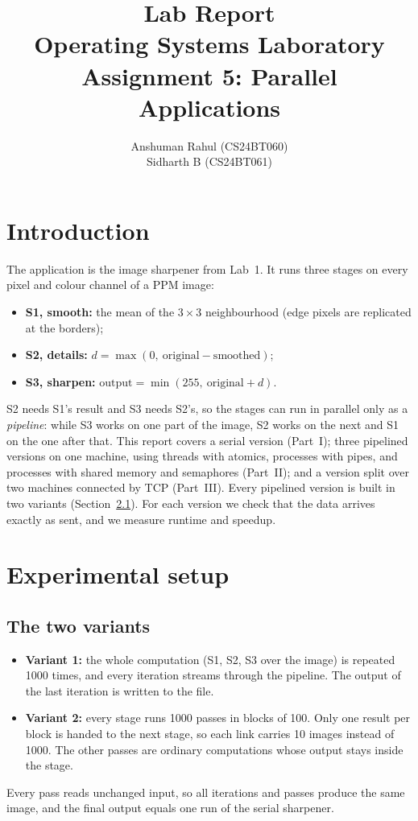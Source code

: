 \documentclass[11pt,a4paper]{article}
\title{\textbf{Lab Report} \\ Operating Systems Laboratory \\ Assignment 5: Parallel Applications}
\author{Anshuman Rahul (CS24BT060) \\ Sidharth B (CS24BT061)}
\date{}
\newcommand{\cfgIterations}{1000}
\newcommand{\cfgPasses}{100}
\newcommand{\cfgResults}{10}
\begin{document}
\maketitle

\section{Introduction}
The application is the image sharpener from Lab~1. It runs three stages on every pixel and
colour channel of a PPM image:
\begin{itemize}
\item \textbf{S1, smooth:} the mean of the $3\times3$ neighbourhood (edge pixels are replicated at
  the borders);
\item \textbf{S2, details:} $d = \max(0,\ \text{original} - \text{smoothed})$;
\item \textbf{S3, sharpen:} $\text{output} = \min(255,\ \text{original} + d)$.
\end{itemize}
S2 needs S1's result and S3 needs S2's, so the stages can run in parallel only as a
\emph{pipeline}: while S3 works on one part of the image, S2 works on the next and S1 on the one
after that. This report covers a serial version (Part~I); three pipelined versions on one
machine, using threads with atomics, processes with pipes, and processes with shared memory and
semaphores (Part~II); and a version split over two machines connected by TCP (Part~III). Every
pipelined version is built in two variants (Section~\ref{sec:variants}). For each version we
check that the data arrives exactly as sent, and we measure runtime and speedup.

\section{Experimental setup}

\subsection{The two variants}
\label{sec:variants}
\begin{itemize}
\item \textbf{Variant 1:} the whole computation (S1, S2, S3 over the image) is repeated
  \cfgIterations{} times, and every iteration streams through the pipeline. The output of the last
  iteration is written to the file.
\item \textbf{Variant 2:} every stage runs \cfgIterations{} passes in blocks of \cfgPasses. Only
  one result per block is handed to the next stage, so each link carries \cfgResults{} images
  instead of \cfgIterations. The other passes are ordinary computations whose output stays inside
  the stage.
\end{itemize}
Every pass reads unchanged input, so all iterations and passes produce the same image, and the
final output equals one run of the serial sharpener.
\end{document}
